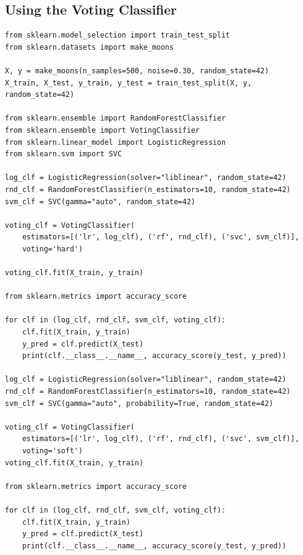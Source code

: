 \documentclass[%
oneside,                 %
final,                   %
10pt]{article}
\begin{document}
\subsection*{Using the Voting Classifier}
\begin{verbatim}
from sklearn.model_selection import train_test_split
from sklearn.datasets import make_moons

X, y = make_moons(n_samples=500, noise=0.30, random_state=42)
X_train, X_test, y_train, y_test = train_test_split(X, y, random_state=42)

from sklearn.ensemble import RandomForestClassifier
from sklearn.ensemble import VotingClassifier
from sklearn.linear_model import LogisticRegression
from sklearn.svm import SVC

log_clf = LogisticRegression(solver="liblinear", random_state=42)
rnd_clf = RandomForestClassifier(n_estimators=10, random_state=42)
svm_clf = SVC(gamma="auto", random_state=42)

voting_clf = VotingClassifier(
    estimators=[('lr', log_clf), ('rf', rnd_clf), ('svc', svm_clf)],
    voting='hard')

voting_clf.fit(X_train, y_train)

from sklearn.metrics import accuracy_score

for clf in (log_clf, rnd_clf, svm_clf, voting_clf):
    clf.fit(X_train, y_train)
    y_pred = clf.predict(X_test)
    print(clf.__class__.__name__, accuracy_score(y_test, y_pred))

log_clf = LogisticRegression(solver="liblinear", random_state=42)
rnd_clf = RandomForestClassifier(n_estimators=10, random_state=42)
svm_clf = SVC(gamma="auto", probability=True, random_state=42)

voting_clf = VotingClassifier(
    estimators=[('lr', log_clf), ('rf', rnd_clf), ('svc', svm_clf)],
    voting='soft')
voting_clf.fit(X_train, y_train)

from sklearn.metrics import accuracy_score

for clf in (log_clf, rnd_clf, svm_clf, voting_clf):
    clf.fit(X_train, y_train)
    y_pred = clf.predict(X_test)
    print(clf.__class__.__name__, accuracy_score(y_test, y_pred))

\end{verbatim}

\end{document}
